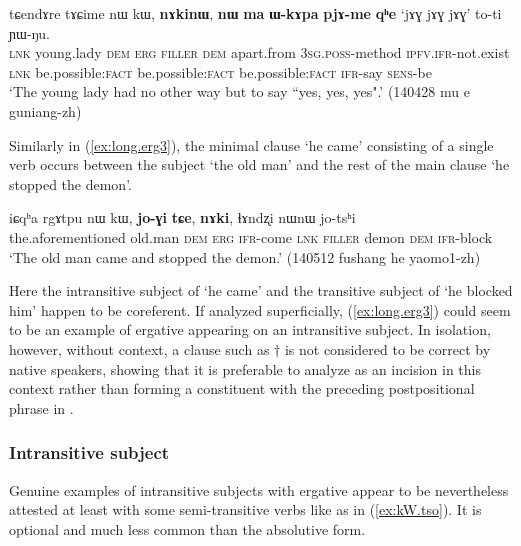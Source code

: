 \begin{exe}
\ex \label{ex:long.erg2}
\gll  tɕendɤre tɤɕime nɯ kɯ, \textbf{nɤkinɯ}, \textbf{nɯ} \textbf{ma} \textbf{ɯ-kɤpa} \textbf{pjɤ-me} \textbf{qʰe} `jɤɣ jɤɣ jɤɣ' 	to-ti ɲɯ-ŋu. \\
\textsc{lnk} young.lady \textsc{dem} \textsc{erg} \textsc{filler} \textsc{dem}  apart.from \textsc{3sg}.\textsc{poss}-method \textsc{ipfv}.\textsc{ifr}-not.exist \textsc{lnk} be.possible:\textsc{fact} be.possible:\textsc{fact} be.possible:\textsc{fact} \textsc{ifr}-say \textsc{sens}-be \\
\glt `The young lady had no other way but to say ``yes, yes, yes".' (140428 mu e guniang-zh) 
\end{exe}

Similarly in (\ref{ex:long.erg3}), the minimal clause  `he came' consisting of a single verb occurs between the subject  `the old man' and the rest of the main clause  `he stopped the demon'.

\begin{exe}
\ex \label{ex:long.erg3}
\gll   iɕqʰa rgɤtpu nɯ kɯ, \textbf{jo-ɣi} \textbf{tɕe}, \textbf{nɤki}, ɬɤndʐi nɯnɯ jo-tsʰi  \\
the.aforementioned old.man \textsc{dem} \textsc{erg} \textsc{ifr}-come \textsc{lnk} \textsc{filler} demon \textsc{dem} \textsc{ifr}-block \\
\glt `The old man came and stopped the demon.' (140512 fushang he yaomo1-zh) 
\end{exe}

Here the intransitive subject of   `he came' and the transitive subject of    `he blocked him' happen to be coreferent. If analyzed superficially, (\ref{ex:long.erg3}) could seem to be an example of ergative appearing on an intransitive subject. In isolation, however, without context, a clause such as $\dagger$ is not considered to be correct by native speakers, showing that it is preferable to analyze   as an incision in this context rather than forming a constituent with the preceding postpositional phrase in .

\subsubsection{Intransitive subject} \label{sec:S.kW}
 
Genuine examples of intransitive subjects with ergative appear to be nevertheless attested at least with some semi-transitive verbs like  as in (\ref{ex:kW.tso}). It is optional and much less common than the absolutive form.

